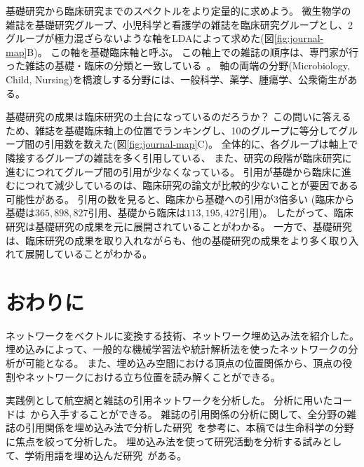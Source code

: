 \documentclass[J]{scitrans}
\begin{document}
基礎研究から臨床研究までのスペクトルをより定量的に求めよう。
微生物学の雑誌を基礎研究グループ、小児科学と看護学の雑誌を臨床研究グループとし、2グループが極力混ざらないような軸をLDAによって求めた(図\ref{fig:journal-map}B)。
この軸を基礎臨床軸と呼ぶ。
この軸上での雑誌の順序は、専門家が行った雑誌の基礎・臨床の分類と一致している~\cite{Narin1976}。
軸の両端の分野(Microbiology, Child, Nursing)を橋渡しする分野には、一般科学、薬学、腫瘍学、公衆衛生がある。


基礎研究の成果は臨床研究の土台になっているのだろうか？
この問いに答えるため、雑誌を基礎臨床軸上の位置でランキングし、10のグループに等分してグループ間の引用数を数えた(図\ref{fig:journal-map}C)。
全体的に、各グループは軸上で隣接するグループの雑誌を多く引用している、
また、研究の段階が臨床研究に進むにつれてグループ間の引用が少なくなっている。
引用が基礎から臨床に進むにつれて減少しているのは、臨床研究の論文が比較的少ないことが要因である可能性がある。
引用の数を見ると、臨床から基礎への引用が3倍多い (臨床から基礎は$365,898,827$引用、基礎から臨床は$113,195,427$引用)。
したがって、臨床研究は基礎研究の成果を元に展開されていることがわかる。
一方で、基礎研究は、臨床研究の成果を取り入れながらも、他の基礎研究の成果をより多く取り入れて展開していることがわかる。

\section{おわりに}

ネットワークをベクトルに変換する技術、ネットワーク埋め込み法を紹介した。
埋め込みによって、一般的な機械学習法や統計解析法を使ったネットワークの分析が可能となる。
また、埋め込み空間における頂点の位置関係から、頂点の役割やネットワークにおける立ち位置を読み解くことができる。


実践例として航空網と雑誌の引用ネットワークを分析した。
分析に用いたコードは~\cite{code}から入手することができる。
雑誌の引用関係の分析に関して、全分野の雑誌の引用関係を埋め込み法で分析した研究~\cite{Peng2020}を参考に、本稿では生命科学の分野に焦点を絞って分析した。
埋め込み法を使って研究活動を分析する試みとして、学術用語を埋め込んだ研究~\cite{Chinazzi2019,Ke2019}がある。
\end{document}

